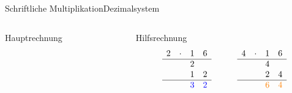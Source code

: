 \documentclass[xelatex,aspectratio=169]{beamer}
\begin{document}
\begin{frame}[t]{Schriftliche Multiplikation}{Dezimalsystem}
\begin{columns}
\begin{column}{0.33\textwidth}
\begin{block}{Hauptrechnung}
      \end{block}
    \end{column}
    \begin{column}{0.67\textwidth}
      \begin{block}{Hilfsrechnung}
        \[
          \begin{matrix}
            2 & \cdot & 1                   & 6                   \\
            \hline
              &       & 2                   &                     \\
              &       & 1                   & 2                   \\
            \hline
              &       & \textcolor{blue}{3} & \textcolor{blue}{2} \\
          \end{matrix} \qquad\qquad \begin{matrix}
            4 & \cdot & 1                     & 6                     \\
            \hline
              &       & 4                     &                       \\
              &       & 2                     & 4                     \\
            \hline
              &       & \textcolor{orange}{6} & \textcolor{orange}{4} \\
          \end{matrix}
        \]
      \end{block}
    \end{column}
  \end{columns}
\end{frame}
\end{document}
